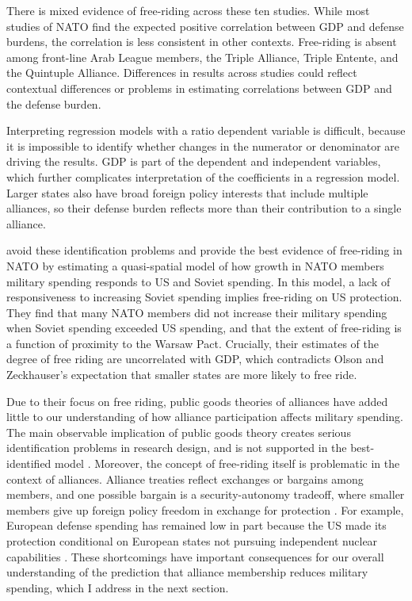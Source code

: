 \documentclass[12pt]{article}
\begin{document}
There is mixed evidence of free-riding across these ten studies. 
While most studies of NATO find the expected positive correlation between GDP and defense burdens, the correlation is less consistent in other contexts. 
Free-riding is absent among front-line Arab League members, the Triple Alliance, Triple Entente, and the Quintuple Alliance. 
Differences in results across studies could reflect contextual differences or problems in estimating correlations between GDP and the defense burden. 


Interpreting regression models with a ratio dependent variable is difficult, because it is impossible to identify whether changes in the numerator or denominator are driving the results. 
GDP is part of the dependent and independent variables, which further complicates interpretation of the coefficients in a regression model.
Larger states also have broad foreign policy interests that include multiple alliances, so their defense burden reflects more than their contribution to a single alliance.  


\citet{PluemperNeumayer2015} avoid these identification problems and provide the best evidence of free-riding in NATO by estimating a quasi-spatial model of how growth in NATO members military spending responds to US and Soviet spending. 
In this model, a lack of responsiveness to increasing Soviet spending implies free-riding on US protection. 
They find that many NATO members did not increase their military spending when Soviet spending exceeded US spending, and that the extent of free-riding is a function of proximity to the Warsaw Pact.
Crucially, their estimates of the degree of free riding are uncorrelated with GDP, which contradicts Olson and Zeckhauser's expectation that smaller states are more likely to free ride. 


Due to their focus on free riding, public goods theories of alliances have added little to our understanding of how alliance participation affects military spending. 
The main observable implication of public goods theory creates serious identification problems in research design, and is not supported in the best-identified model \citep{PluemperNeumayer2015}. 
Moreover, the concept of free-riding itself is problematic in the context of alliances. 
Alliance treaties reflect exchanges or bargains among members, and one possible bargain is a security-autonomy tradeoff, where smaller members give up foreign policy freedom in exchange for protection \citep{Morrow1991}. 
For example, European defense spending has remained low in part because the US made its protection conditional on European states not pursuing independent nuclear capabilities \citep{Lanoszka2015}. 
These shortcomings have important consequences for our overall understanding of the prediction that alliance membership reduces military spending, which I address in the next section. 
\end{document}
